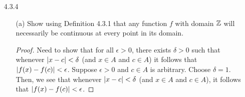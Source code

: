 \documentclass[12pt,letterpaper]{article}
\begin{document}
\begin{itemize}[leftmargin=!,labelindent=5pt]
\begin{itemize}
                    If $f$ is continuous at $c \in A$, and if $g$ is continuous at $f(c) \in B$, then $g \circ f$ is continuous at $c$.
                    \begin{proof}
                        Suppose $\epsilon > 0$ is arbitrary.
                        Since $g$ is continuous at $f(c) \in B$, there exists a $\delta_1>0$ such that $\abs{g(f(x))-g(f(c))} < \epsilon$ whenever $\abs{f(x) - f(c)} < \delta_1$ (and $x \in A$ and $f(x) \in B$).
                        Since $f$ is continuous at $c \in A$, there exists a $\delta > 0$ such that $\abs{f(x) - f(c)} < \delta_1$ whenever $\abs{x-c} < \delta$ (and $x \in A$).
                        Combining both of the above parts, we see that for all $\epsilon > 0$, there exists a $\delta > 0$ such that $\abs{x-c} < \delta$ implies $\abs{f(x) - f(c)} < \delta_1$ which implies $\abs{g(f(x))-g(f(c))} < \epsilon$.
                        Thus, by definition of continuity, $g \circ f$ is continuous at $c$.
                    \end{proof}
                \item [(b)] Give another proof of this theorem using the sequential characterization of continuity (from Theorem 4.3.2 (iv)).
                    \begin{proof}
                        Assume that $(x_n) \to c$ (with $x_n \in A$).
                        Since $f$ is continuous at $c$, $f(x_n) \to f(c)$ by Theorem 4.3.2 (iv) (Characterizations of Continuity).
                        Since $g$ is continuous at $f(c)$, $g(f(x_n)) \to g(f(c))$ by Theorem 4.3.2 (iv).
                        Thus, by Theorem 4.3.2 (iv), $g \circ f$ is continuous at $c$.
                    \end{proof}
            \end{itemize}
        \item [4.3.4] 
            \begin{itemize}
                \item [(a)] Show using Definition 4.3.1 that any function $f$ with domain $\mathbb{Z}$ will necessarily be continuous at every point in its domain.
                    \begin{proof}
                        Need to show that for all $\epsilon > 0$, there exists $\delta > 0$ such that whenever $\abs{x-c} < \delta$ (and $x \in A$ and $c\in A$) it follows that $\abs{f(x) - f(c)} < \epsilon$.
                        Suppose $\epsilon > 0$ and $c \in A$ is arbitrary.
                        Choose $\delta = 1$.
                        Then, we see that whenever $\abs{x-c} < \delta$ (and $x \in A$ and $c\in A$), it follows that $\abs{f(x) - f(c)} < \epsilon$.

\end{proof}
\end{itemize}
\end{itemize}
\end{document}
